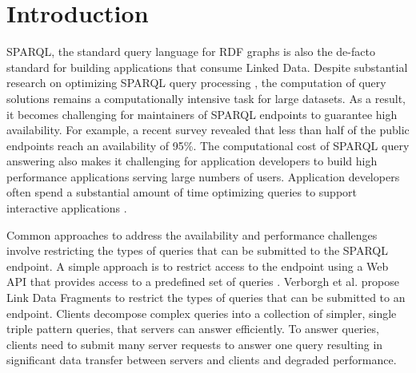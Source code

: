 \section{Introduction}
SPARQL, the standard query language for RDF graphs is also the de-facto standard for building applications that consume Linked Data. 
Despite substantial research on optimizing SPARQL query processing \cite{Pham2013}, the computation of query solutions remains a computationally intensive task for large datasets.
As a result, it becomes challenging for maintainers of SPARQL endpoints to guarantee high availability.
For example, a recent survey \cite{buil2013sparql} revealed that less than half of the public endpoints reach an availability of 95\%.
The computational cost of SPARQL query answering also makes it challenging for application developers to build high performance applications serving large numbers of users.
Application developers often spend a substantial amount of time optimizing queries to support interactive applications \cite{Loizou_Angles_Groth_2014}.

Common approaches to address the availability and performance challenges involve restricting the types of queries that can be submitted to the SPARQL endpoint.
A simple approach is to restrict access to the endpoint using a Web API that provides access to a predefined set of queries \cite{Groth_Loizou_Gray_Goble_Harland_Pettifer_2014}.
%
Verborgh et al. \cite{Verborgh2014} propose Link Data Fragments to restrict the types of queries that can be submitted to an endpoint. 
Clients decompose complex queries into a collection of simpler, single triple pattern queries, that servers can answer efficiently.
To answer queries, clients need to submit many server requests to answer one query resulting in significant data transfer between servers and clients and degraded performance. 